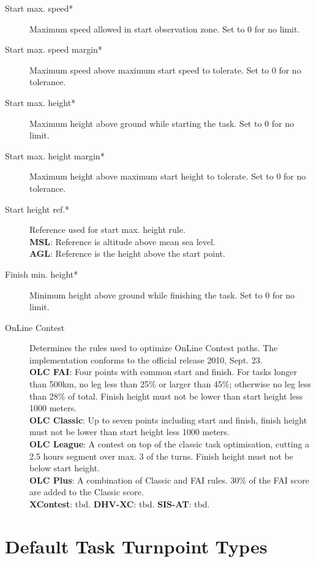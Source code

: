 \begin{description}
\item[Start max. speed*]  Maximum speed allowed in start observation zone.  Set 
  to 0 for no limit.
\item[Start max. speed margin*] Maximum speed above maximum start speed to tolerate. 
  Set to 0 for no tolerance.
\item[Start max. height*]  Maximum height above ground while starting the task. 
  Set to 0 for no limit.
\item[Start max. height margin*]  Maximum height above maximum start height to 
  tolerate.  Set to 0 for no tolerance.
\item[Start height ref.*]  Reference used for start max. height rule. \\
  {\bf MSL}: Reference is altitude above mean sea level. \\
  {\bf AGL}: Reference is the height above the start point.
\item[Finish min. height*]  Minimum height above ground while finishing the task. 
  Set to 0 for no limit. 
\item[OnLine Contest] Determines the rules used to optimize OnLine Contest 
  paths.  The implementation  conforms to the official release 2010, Sept. 23. \\
  {\bf OLC FAI}: Four points with common start and finish.  For tasks longer than
  500km, no leg less than 25\% or larger than 45\%; otherwise no leg less than 28\% 
  of total.  Finish height must not be lower than start height less 1000 meters. \\
  {\bf OLC Classic}: Up to seven points including start and finish, finish height
  must not be lower than start height less 1000 meters. \\
  {\bf OLC League}: A contest on top of the classic task optimisation, cutting
  a 2.5 hours segment over max. 3 of the turns. Finish height must not be below
  start height. \\
  {\bf OLC Plus}: A combination of Classic and FAI rules. 30\% of the FAI score
  are added to the Classic score. \\
  {\bf XContest}: tbd.
  {\bf DHV-XC}: tbd.
  {\bf SIS-AT}: tbd. 
\end{description}


\section{Default Task Turnpoint Types}

